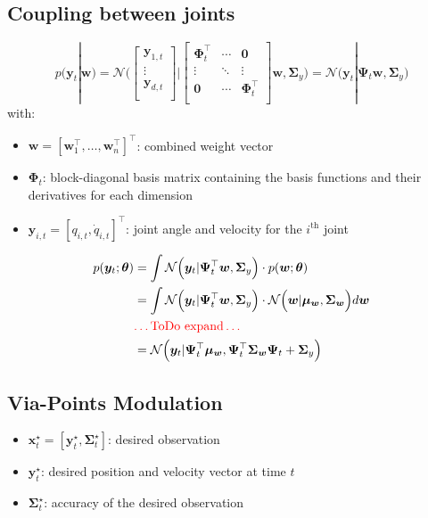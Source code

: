 \documentclass[11pt, letterpaper]{article}
\begin{document}
\subsection{Coupling between joints}
\label{sec:org677edc1}
\begin{equation}
p(\bm{y}_t|\bm{w}) = \mathcal{N}\Bigg(
        \begin{bmatrix}
                \bm{y}_{1,t} \\
                \vdots\\
                \bm{y}_{d,t} \\
        \end{bmatrix}
        \Bigg|
        \begin{bmatrix}
                \bm{\Phi}^{\top}_{t} & \cdots & \bm{0} \\
                \vdots &\ddots & \vdots\\
                \bm{0} & \cdots & \bm{\Phi}^{\top}_{t} \\
        \end{bmatrix}
        \bm{w}, \bm{\Sigma}_y
\Bigg) = \mathcal{N}\Big(\bm{y}_t|\bm{\Psi}_t\bm{w},\bm{\Sigma}_y \Big)
\end{equation}
with:
\begin{itemize}
\item \(\bm{w}=[\bm{w}^\top_1, \dots, \bm{w}^\top_n]^\top\): combined weight vector
\item \(\bm{\Phi}_t\): block-diagonal basis matrix containing the basis functions and their derivatives for each dimension
\item \(\bm{y}_{i,t} = [q_{i,t}, \dot{q}_{i,t}]^\top\): joint angle and velocity for the \(i^{\text{th}}\) joint
\end{itemize}

\begin{align}
p(\bm{y}_t; \bm{\theta}) &= \int \mathcal{N}\Big(\bm{y}_t|\bm{\Psi}^\top_t \bm{w}, \bm{\Sigma}_y \Big) \cdot p(\bm{w}; \bm{\theta})\\
&= \int \mathcal{N}\Big(\bm{y}_t|\bm{\Psi}^\top_t \bm{w}, \bm{\Sigma}_y \Big) \cdot \mathcal{N}\Big(\bm{w}|\bm{\mu_w}, \bm{\Sigma_w} \Big) d\bm{w}\\
& \textcolor{red}{\dots\text{ToDo expand}\dots}\\
&= \mathcal{N}\Big( \bm{y}_t | \bm{\Psi}^\top_t \bm{\mu_w}, \bm{\Psi}^\top_t \bm{\Sigma_w} \bm{\Psi}_t + \bm{\Sigma}_y \Big)
\end{align}
\subsection{Via-Points Modulation}
\label{sec:orgab307f1}
\begin{itemize}
\item \(\bm{x}_t^\star = [\bm{y}_t^\star, \bm{\Sigma}^\star_t]\): desired observation
\item \(\bm{y}^\star_t\): desired position and velocity vector at time \(t\)
\item \(\bm{\Sigma}^\star_t\): accuracy of the desired observation
\end{itemize}
\end{document}
